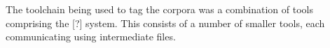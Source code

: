 The toolchain being used to tag the corpora was a combination of tools comprising the [?] system.  This consists of a number of smaller tools, each communicating using intermediate files.

